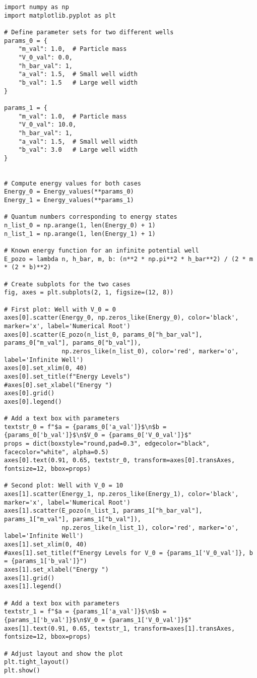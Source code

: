 \documentclass[11pt]{article}
\begin{document}
\begin{verbatim}
import numpy as np
import matplotlib.pyplot as plt

# Define parameter sets for two different wells
params_0 = {
    "m_val": 1.0,  # Particle mass
    "V_0_val": 0.0,
    "h_bar_val": 1,
    "a_val": 1.5,  # Small well width
    "b_val": 1.5   # Large well width
}

params_1 = {
    "m_val": 1.0,  # Particle mass
    "V_0_val": 10.0,
    "h_bar_val": 1,
    "a_val": 1.5,  # Small well width
    "b_val": 3.0   # Large well width
}


# Compute energy values for both cases
Energy_0 = Energy_values(**params_0)
Energy_1 = Energy_values(**params_1)

# Quantum numbers corresponding to energy states
n_list_0 = np.arange(1, len(Energy_0) + 1)
n_list_1 = np.arange(1, len(Energy_1) + 1)

# Known energy function for an infinite potential well
E_pozo = lambda n, h_bar, m, b: (n**2 * np.pi**2 * h_bar**2) / (2 * m * (2 * b)**2)

# Create subplots for the two cases
fig, axes = plt.subplots(2, 1, figsize=(12, 8))

# First plot: Well with V_0 = 0
axes[0].scatter(Energy_0, np.zeros_like(Energy_0), color='black', marker='x', label='Numerical Root')
axes[0].scatter(E_pozo(n_list_0, params_0["h_bar_val"], params_0["m_val"], params_0["b_val"]),
                np.zeros_like(n_list_0), color='red', marker='o', label='Infinite Well')
axes[0].set_xlim(0, 40)
axes[0].set_title(f"Energy Levels")
#axes[0].set_xlabel("Energy ")
axes[0].grid()
axes[0].legend()

# Add a text box with parameters
textstr_0 = f"$a = {params_0['a_val']}$\n$b = {params_0['b_val']}$\n$V_0 = {params_0['V_0_val']}$"
props = dict(boxstyle="round,pad=0.3", edgecolor="black", facecolor="white", alpha=0.5)
axes[0].text(0.91, 0.65, textstr_0, transform=axes[0].transAxes, fontsize=12, bbox=props)

# Second plot: Well with V_0 = 10
axes[1].scatter(Energy_1, np.zeros_like(Energy_1), color='black', marker='x', label='Numerical Root')
axes[1].scatter(E_pozo(n_list_1, params_1["h_bar_val"], params_1["m_val"], params_1["b_val"]),
                np.zeros_like(n_list_1), color='red', marker='o', label='Infinite Well')
axes[1].set_xlim(0, 40)
#axes[1].set_title(f"Energy Levels for V_0 = {params_1['V_0_val']}, b = {params_1['b_val']}")
axes[1].set_xlabel("Energy ")
axes[1].grid()
axes[1].legend()

# Add a text box with parameters
textstr_1 = f"$a = {params_1['a_val']}$\n$b = {params_1['b_val']}$\n$V_0 = {params_1['V_0_val']}$"
axes[1].text(0.91, 0.65, textstr_1, transform=axes[1].transAxes, fontsize=12, bbox=props)

# Adjust layout and show the plot
plt.tight_layout()
plt.show()
\end{verbatim}
\end{document}
